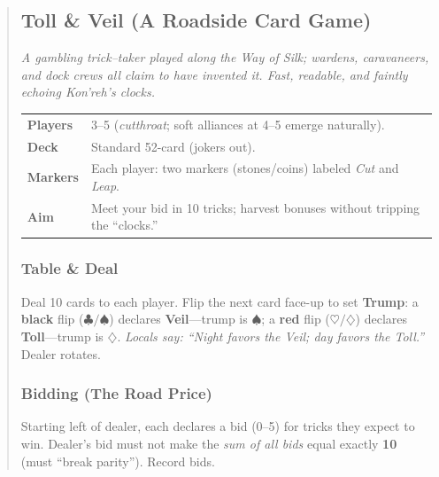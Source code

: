 \documentclass[11pt]{article}
\begin{document}
\begin{quote}
\clearpage

\subsection{Toll \& Veil (A Roadside Card Game)}
\emph{A gambling trick–taker played along the Way of Silk; wardens, caravaneers,
and dock crews all claim to have invented it. Fast, readable, and faintly
echoing Kon'reh's clocks.}

\vspace{0.25em}
\noindent\begin{tabularx}{\linewidth}{@{}>{\bfseries}l X@{}}
\toprule
Players & 3–5 (\emph{cutthroat}; soft alliances at 4–5 emerge naturally).\\
Deck & Standard 52-card (jokers out).\\
Markers & Each player: two markers (stones/coins) labeled \emph{Cut} and \emph{Leap}.\\
Aim & Meet your bid in 10 tricks; harvest bonuses without tripping the “clocks.”\\
\bottomrule
\end{tabularx}

\subsubsection*{Table \& Deal}
Deal 10 cards to each player. Flip the next card face-up to set \textbf{Trump}:
a \textbf{black} flip ($\clubsuit/\spadesuit$) declares \textbf{Veil}—trump is $\spadesuit$;
a \textbf{red} flip ($\heartsuit/\diamondsuit$) declares \textbf{Toll}—trump is $\diamondsuit$.
\emph{Locals say: “Night favors the Veil; day favors the Toll.”} Dealer rotates.

\subsubsection*{Bidding (The Road Price)}
Starting left of dealer, each declares a bid (0–5) for tricks they expect to win.
Dealer’s bid must not make the \emph{sum of all bids} equal exactly \textbf{10} (must “break parity”). Record bids.


\end{quote}
\end{document}
